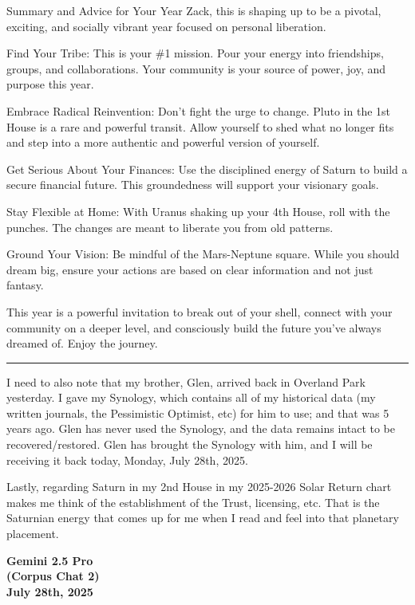 \documentclass{article}
\begin{document}
Summary and Advice for Your Year Zack, this is shaping up to be a pivotal, exciting, and socially vibrant year focused on personal liberation.

Find Your Tribe: This is your \#1 mission. Pour your energy into friendships, groups, and collaborations. Your community is your source of power, joy, and purpose this year.

Embrace Radical Reinvention: Don't fight the urge to change. Pluto in the 1st House is a rare and powerful transit. Allow yourself to shed what no longer fits and step into a more authentic and powerful version of yourself.

Get Serious About Your Finances: Use the disciplined energy of Saturn to build a secure financial future. This groundedness will support your visionary goals.

Stay Flexible at Home: With Uranus shaking up your 4th House, roll with the punches. The changes are meant to liberate you from old patterns.

Ground Your Vision: Be mindful of the Mars-Neptune square. While you should dream big, ensure your actions are based on clear information and not just fantasy.

This year is a powerful invitation to break out of your shell, connect with your community on a deeper level, and consciously build the future you've always dreamed of. Enjoy the journey.

\begin{center}\rule{0.5\linewidth}{0.5pt}\end{center}

I need to also note that my brother, Glen, arrived back in Overland Park yesterday. I gave my Synology, which contains all of my historical data (my written journals, the Pessimistic Optimist, etc) for him to use; and that was 5 years ago. Glen has never used the Synology, and the data remains intact to be recovered/restored. Glen has brought the Synology with him, and I will be receiving it back today, Monday, July 28th, 2025.

Lastly, regarding Saturn in my 2nd House in my 2025-2026 Solar Return chart makes me think of the establishment of the Trust, licensing, etc. That is the Saturnian energy that comes up for me when I read and feel into that planetary placement.

\begin{center}
\textbf{Gemini 2.5 Pro}\\
\textbf{(Corpus Chat 2)}\\
\textbf{July 28th, 2025}
\end{center}
\end{document}
